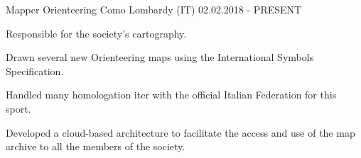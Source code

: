 
\cventry
{Mapper}
{Orienteering Como}
{Lombardy (IT)}
{02.02.2018 - PRESENT}
{
  \begin{cvitems}
    \item {Responsible for the society's cartography.}
    \item {Drawn several new Orienteering maps using the International Symbols Specification.}
    \item {Handled many homologation iter with the official Italian Federation for this sport.}
    \item {Developed a cloud-based architecture to facilitate the access and use of the map archive to all the members of the society.}
  \end{cvitems}
}